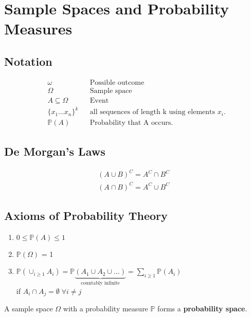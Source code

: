 \section{Sample Spaces and Probability Measures}
\subsection{Notation}
\noindent\begin{align*}
     & \omega                 &  & \text{Possible outcome}                               \\
     & \Omega                 &  & \text{Sample space}                                   \\
     & A \subseteq \Omega     &  & \text{Event}                                          \\
     & {\{x_1 \dots x_n \}}^k &  & \text{all sequences of length k using elements } x_i. \\
     & \mathbb{P}(A)          &  & \text{Probability that A occurs.}
\end{align*}
\subsection{De Morgan's Laws}
\noindent\begin{align*}
    {(A\cup B)}^C = A^C\cap B^C \\
    {(A\cap B)}^C = A^C\cup B^C
\end{align*}

\subsection{Axioms of Probability Theory}
\begin{enumerate}
    \item $0\leq \mathbb{P}(A)\leq 1$
    \item $\mathbb{P}(\Omega)$ = 1
    \item $\mathbb{P}\left(\cup_{i\geq 1} A_i\right) = \mathbb{P}\underbrace{(A_1 \cup A_2 \cup \dots)}_{\text{countably infinite}} = \sum_{i\geq 1} \mathbb{P}(A_i)$\\
          if $A_{i} \cap A_{j} = \emptyset \; \forall i \ne j$
\end{enumerate}
A sample space $\Omega$ with a probability measure $\mathbb{P}$ forms a \textbf{probability space}.

